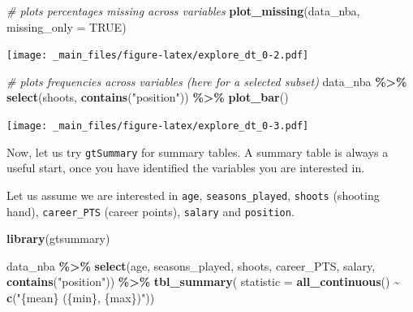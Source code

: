 \documentclass[
]{book}
\newenvironment{Shaded}{\begin{snugshade}}{\end{snugshade}}
\newcommand{\AttributeTok}[1]{\textcolor[rgb]{0.13,0.29,0.53}{#1}}
\newcommand{\CommentTok}[1]{\textcolor[rgb]{0.56,0.35,0.01}{\textit{#1}}}
\newcommand{\ConstantTok}[1]{\textcolor[rgb]{0.56,0.35,0.01}{#1}}
\newcommand{\FunctionTok}[1]{\textcolor[rgb]{0.13,0.29,0.53}{\textbf{#1}}}
\newcommand{\NormalTok}[1]{#1}
\newcommand{\SpecialCharTok}[1]{\textcolor[rgb]{0.81,0.36,0.00}{\textbf{#1}}}
\newcommand{\StringTok}[1]{\textcolor[rgb]{0.31,0.60,0.02}{#1}}
\begin{document}
\begin{Shaded}
\begin{Highlighting}[]
\CommentTok{\# plots percentages missing across variables}
\FunctionTok{plot\_missing}\NormalTok{(data\_nba, }\AttributeTok{missing\_only =} \ConstantTok{TRUE}\NormalTok{)}
\end{Highlighting}
\end{Shaded}

\texttt{[image: \_main\_files/figure-latex/explore\_dt\_0-2.pdf]}

\begin{Shaded}
\begin{Highlighting}[]
\CommentTok{\# plots frequencies across variables (here for a selected subset)}
\NormalTok{data\_nba }\SpecialCharTok{\%\textgreater{}\%} 
  \FunctionTok{select}\NormalTok{(shoots, }\FunctionTok{contains}\NormalTok{(}\StringTok{"position"}\NormalTok{)) }\SpecialCharTok{\%\textgreater{}\%} 
  \FunctionTok{plot\_bar}\NormalTok{()}
\end{Highlighting}
\end{Shaded}

\texttt{[image: \_main\_files/figure-latex/explore\_dt\_0-3.pdf]}

Now, let us try \texttt{gtSummary} for summary tables. A summary table is always a useful start, once you have identified the variables you are interested in.

Let us assume we are interested in \texttt{age}, \texttt{seasons\_played}, \texttt{shoots} (shooting hand), \texttt{career\_PTS} (career points), \texttt{salary} and \texttt{position}.

\begin{Shaded}
\begin{Highlighting}[]
\FunctionTok{library}\NormalTok{(gtsummary)}

\NormalTok{data\_nba }\SpecialCharTok{\%\textgreater{}\%} 
  \FunctionTok{select}\NormalTok{(age, seasons\_played, shoots, career\_PTS, salary, }\FunctionTok{contains}\NormalTok{(}\StringTok{"position"}\NormalTok{)) }\SpecialCharTok{\%\textgreater{}\%}
         \FunctionTok{tbl\_summary}\NormalTok{(}
           \AttributeTok{statistic =} \FunctionTok{all\_continuous}\NormalTok{() }\SpecialCharTok{\textasciitilde{}} \FunctionTok{c}\NormalTok{(}\StringTok{"\{mean\} (\{min\}, \{max\})"}\NormalTok{)) }
\end{Highlighting}
\end{Shaded}
\end{document}
